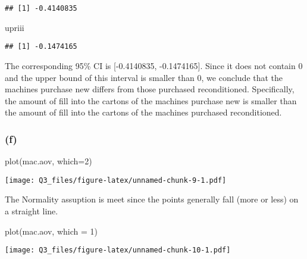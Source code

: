 \documentclass[
]{article}
\newenvironment{Shaded}{\begin{snugshade}}{\end{snugshade}}
\newcommand{\AttributeTok}[1]{\textcolor[rgb]{0.77,0.63,0.00}{#1}}
\newcommand{\DecValTok}[1]{\textcolor[rgb]{0.00,0.00,0.81}{#1}}
\newcommand{\FunctionTok}[1]{\textcolor[rgb]{0.00,0.00,0.00}{#1}}
\newcommand{\NormalTok}[1]{#1}
\newcommand{\OtherTok}[1]{\textcolor[rgb]{0.56,0.35,0.01}{#1}}
\newcommand{\SpecialCharTok}[1]{\textcolor[rgb]{0.00,0.00,0.00}{#1}}
\newcommand{\StringTok}[1]{\textcolor[rgb]{0.31,0.60,0.02}{#1}}
\begin{document}
\begin{verbatim}
## [1] -0.4140835
\end{verbatim}

\begin{Shaded}
\begin{Highlighting}[]
\NormalTok{upriii}
\end{Highlighting}
\end{Shaded}

\begin{verbatim}
## [1] -0.1474165
\end{verbatim}

The corresponding 95\% CI is {[}-0.4140835, -0.1474165{]}. Since it does
not contain 0 and the upper bound of this interval is smaller than 0, we
conclude that the machines purchase new differs from those purchased
reconditioned. Specifically, the amount of fill into the cartons of the
machines purchase new is smaller than the amount of fill into the
cartons of the machines purchased reconditioned.

\hypertarget{f}{%
\subsubsection{(f)}\label{f}}

\begin{Shaded}
\begin{Highlighting}[]
\FunctionTok{plot}\NormalTok{(mac.aov, }\AttributeTok{which=}\DecValTok{2}\NormalTok{)}
\end{Highlighting}
\end{Shaded}

\texttt{[image: Q3\_files/figure-latex/unnamed-chunk-9-1.pdf]}

The Normality assuption is meet since the points generally fall (more or
less) on a straight line.

\begin{Shaded}
\begin{Highlighting}[]
\FunctionTok{plot}\NormalTok{(mac.aov, }\AttributeTok{which =} \DecValTok{1}\NormalTok{)}
\end{Highlighting}
\end{Shaded}

\texttt{[image: Q3\_files/figure-latex/unnamed-chunk-10-1.pdf]}

\begin{Shaded}
\end{Shaded}
\end{document}
